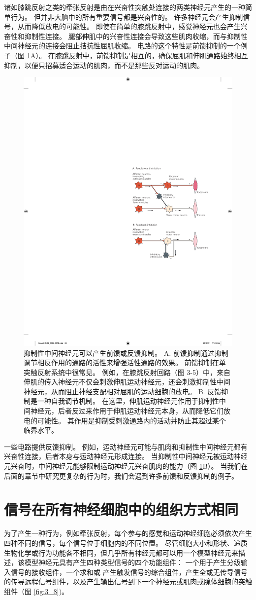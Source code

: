 诸如膝跳反射之类的牵张反射是由在兴奋性突触处连接的两类神经元产生的一种简单行为。 
但并非大脑中的所有重要信号都是兴奋性的。 
许多神经元会产生抑制信号，从而降低放电的可能性。 
即使在简单的膝跳反射中，感觉神经元也会产生兴奋性和抑制性连接。 
腿部伸肌中的兴奋性连接会导致这些肌肉收缩，而与抑制性中间神经元的连接会阻止拮抗性屈肌收缩。 
电路的这个特性是前馈抑制的一个例子（图 \ref{fig:3_7}A）。 
在膝跳反射中，前馈抑制是相互的，确保屈肌和伸肌通路始终相互抑制，以便只招募适合运动的肌肉，而不是那些反对运动的肌肉。

\begin{figure}[htbp]
	\centering
	\includegraphics[width=0.5\linewidth]{chap03/fig_3_7}
	\caption{抑制性中间神经元可以产生前馈或反馈抑制。 
		A. 前馈抑制通过抑制调节相反作用的通路的活性来增强活性通路的效果。 
		前馈抑制在单突触反射系统中很常见。 
		例如，在膝跳反射回路（图 3-5）中，来自伸肌的传入神经元不仅会刺激伸肌运动神经元，还会刺激抑制性中间神经元，从而阻止神经支配相对屈肌的运动细胞的放电。 
		B. 反馈抑制是一种自我调节机制。 
		在这里，伸肌运动神经元作用于抑制性中间神经元，后者反过来作用于伸肌运动神经元本身，从而降低它们放电的可能性。 
		其作用是抑制受刺激通路内的活动并防止其超过某个临界水平。}
	\label{fig:3_7}
\end{figure}


一些电路提供反馈抑制。 
例如，运动神经元可能与肌肉和抑制性中间神经元都有兴奋性连接，后者本身与运动神经元形成连接。 
当抑制性中间神经元被运动神经元兴奋时，中间神经元能够限制运动神经元兴奋肌肉的能力（图 \ref{fig:3_7}B）。 
当我们在后面的章节中研究更复杂的行为时，我们会遇到许多前馈和反馈抑制的例子。


\section{信号在所有神经细胞中的组织方式相同}
为了产生一种行为，例如牵张反射，每个参与的感觉和运动神经细胞必须依次产生四种不同的信号，每个信号位于细胞内的不同位置。 
尽管细胞大小和形状、递质生物化学或行为功能各不相同，但几乎所有神经元都可以用一个模型神经元来描述，该模型神经元具有产生四种类型信号的四个功能组件：
一个用于产生分级输入信号的接收组件，一个求和或 产生触发信号的综合组件，产生全或无传导信号的传导远程信号组件，以及产生输出信号到下一个神经元或肌肉或腺体细胞的突触组件（图 \ref{fig:3_8})。


